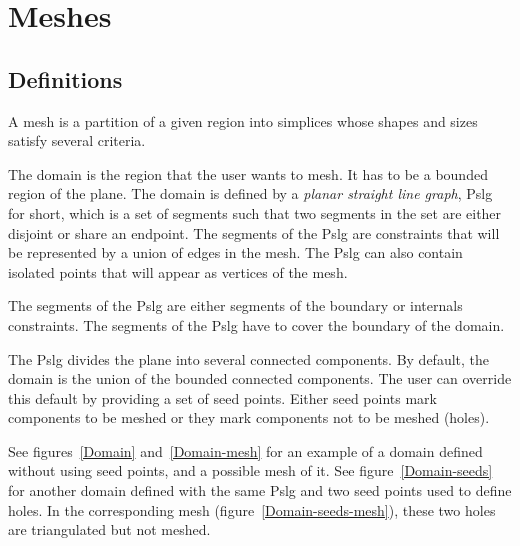 \section{Meshes}
\label{sec:Mesh_2_meshes}


\subsection{Definitions}
\label{sec:Mesh_2_meshes_definition}

A mesh is a partition of a given region into simplices whose shapes
and sizes satisfy several criteria.

The domain is the region that the user wants to mesh. It has to be
  a bounded region of the plane. The domain is defined by a \emph{planar
  straight line graph}, {\sc Pslg} for short, which is a set of segments
  such that two segments in the set are either disjoint or share an
  endpoint. The segments of the {\sc Pslg} are constraints that will be
  represented by a union of edges in the mesh. The {\sc Pslg} can also
  contain isolated points that will appear as vertices of the mesh.

The segments of the {\sc Pslg} are either segments of the
boundary or internals constraints. The segments of the {\sc Pslg} have to
cover the boundary of the domain.

The {\sc Pslg} divides the plane into several connected components. By
default, the domain is the union of the bounded connected components. The
user can override this default by providing a set of seed points. Either
seed points mark components to be meshed or they mark components not to be
meshed (holes).

See figures~\ref{Domain} and~\ref{Domain-mesh} for an example of a domain
defined without using seed points, and a possible mesh of it. See
figure~\ref{Domain-seeds} for another domain defined with the same {\sc
  Pslg} and two seed points used to define holes. 
In the corresponding mesh (figure~\ref{Domain-seeds-mesh}), these
two holes are triangulated but not meshed.

